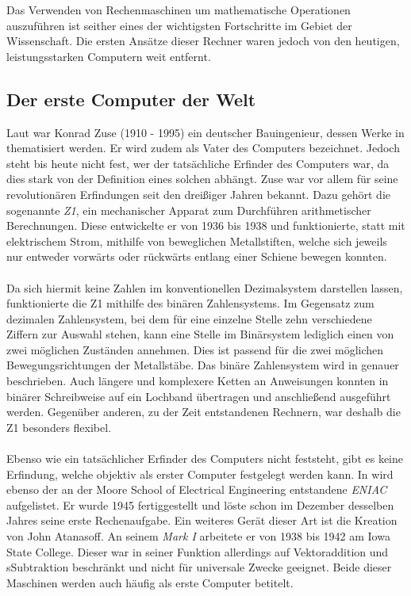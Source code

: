 Das Verwenden von Rechenmaschinen um mathematische Operationen auszuführen ist seither eines der wichtigsten Fortschritte im Gebiet der Wissenschaft. Die ersten Ansätze dieser Rechner waren jedoch von den heutigen, leistungsstarken Computern weit entfernt.
\subsection{Der \glqq{}erste Computer\grqq{} der Welt}
Laut \cite{bruderer2011konrad} war Konrad Zuse (1910 - 1995) ein deutscher Bauingenieur, dessen Werke in \cite{konradz1z2} thematisiert werden. Er wird zudem als \glqq{}Vater des Computers\grqq{} bezeichnet. Jedoch steht bis heute nicht fest, wer der tatsächliche Erfinder des Computers war, da dies stark von der Definition eines solchen abhängt. Zuse war vor allem für seine revolutionären Erfindungen seit den dreißiger Jahren bekannt. Dazu gehört die sogenannte \textit{Z1}, ein mechanischer Apparat zum Durchführen arithmetischer Berechnungen. Diese entwickelte er von 1936 bis 1938 und funktionierte, statt mit elektrischem Strom, mithilfe von beweglichen Metallstiften, welche sich jeweils nur entweder vorwärts oder rückwärts entlang einer Schiene bewegen konnten.\\\\
Da sich hiermit keine Zahlen im konventionellen Dezimalsystem darstellen lassen, funktionierte die Z1 mithilfe des binären Zahlensystems. Im Gegensatz zum dezimalen Zahlensystem, bei dem für eine einzelne Stelle zehn verschiedene Ziffern zur Auswahl stehen, kann eine Stelle im Binärsystem lediglich einen von zwei möglichen Zuständen annehmen. Dies ist passend für die zwei möglichen Bewegungsrichtungen der Metallstäbe. Das binäre Zahlensystem wird in  genauer beschrieben. Auch längere und komplexere Ketten an Anweisungen konnten in binärer Schreibweise auf ein Lochband übertragen und anschließend ausgeführt werden. Gegenüber anderen, zu der Zeit entstandenen Rechnern, war deshalb die Z1 besonders flexibel.\\\\
Ebenso wie ein tatsächlicher Erfinder des Computers nicht feststeht, gibt es keine Erfindung, welche objektiv als \glqq{}erster Computer\grqq{} festgelegt werden kann. In \cite{konradz1z2} wird ebenso der an der Moore School of Electrical Engineering entstandene \glqq{}\textit{ENIAC}\grqq{} aufgelistet. Er wurde 1945 fertiggestellt und löste schon im Dezember desselben Jahres seine erste Rechenaufgabe. Ein weiteres Gerät dieser Art ist die Kreation von John Atanasoff. An seinem \glqq{}\textit{Mark I}\grqq{} arbeitete er von 1938 bis 1942 am Iowa State College. Dieser war in seiner Funktion allerdings auf Vektoraddition und sSubtraktion beschränkt und nicht für universale Zwecke geeignet. Beide dieser Maschinen werden auch häufig als \glqq{}erste Computer\grqq{} betitelt.\\\\
